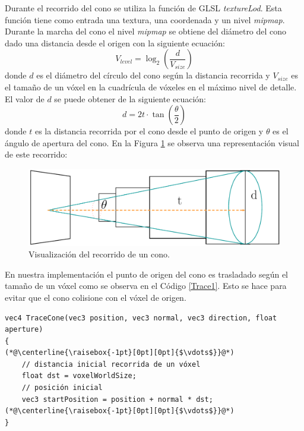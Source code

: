 Durante el recorrido del cono se utiliza la función de GLSL \emph{textureLod}. Esta función tiene como entrada una textura, una coordenada y un nivel \emph{mipmap}. Durante la marcha del cono el nivel \emph{mipmap} se obtiene del diámetro del cono dado una distancia desde el origen con la siguiente ecuación:
\begin{equation}
    V_{level} = \log_2\left(\frac{d}{V_{size}}\right)
\end{equation} donde $d$ es el diámetro del círculo del cono según la distancia recorrida y $V_{size}$ es el tamaño de un vóxel en la cuadrícula de vóxeles en el máximo nivel de detalle. El valor de $d$ se puede obtener de la siguiente ecuación:
\begin{equation}
    d = 2t\cdot\tan\left(\frac{\theta}{2}\right)
\end{equation} donde $t$ es la distancia recorrida por el cono desde el punto de origen y $\theta$ es el ángulo de apertura del cono. En la Figura \ref{fig:cone_trace_impl_fi} se observa una representación visual de este recorrido:
\begin{figure}[H]
    \centering
    \captionsetup{justification=centering}
    \includegraphics[width=.9\linewidth]{media/cone.pdf}
    \caption{Visualización del recorrido de un cono.}
    \label{fig:cone_trace_impl_fi}
\end{figure}

En nuestra implementación el punto de origen del cono es trasladado según el tamaño de un vóxel como se observa en el Código \ref{Trace1}. Esto se hace para evitar que el cono colisione con el vóxel de origen.
\\
\begin{lstlisting}[caption={Traslado de origen del cono.}, label=Trace1]
vec4 TraceCone(vec3 position, vec3 normal, vec3 direction, float aperture)
{
(*@\centerline{\raisebox{-1pt}[0pt][0pt]{$\vdots$}}@*)
    // distancia inicial recorrida de un vóxel 
    float dst = voxelWorldSize;
    // posición inicial
    vec3 startPosition = position + normal * dst;
(*@\centerline{\raisebox{-1pt}[0pt][0pt]{$\vdots$}}@*)
}
\end{lstlisting}

